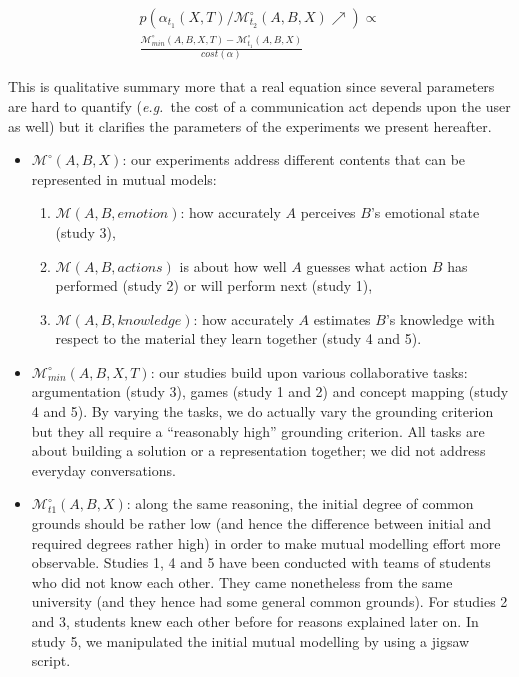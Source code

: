 \documentclass[natbib]{svjour3}
\newcommand{\eg}{{\textit{e.g.\ }}}
\newcommand{\model}[3]{{$\mathcal{M}(#1, #2, #3)$}}
\newcommand{\Model}[3]{{$\mathcal{M}^{\circ}(#1, #2, #3)$}}
\begin{document}
\begin{multline} \label{eq:probrepair}
    p(\alpha_{t_1}(X,T) / \mathcal{M}^{\circ}_{t_2}(A,B,X) \nearrow) \propto \\
    \frac{\mathcal{M}^{\circ}_{min}(A,B,X,T) - \mathcal{M}^{\circ}_{t_1}(A,B,X)}{cost (\alpha)}
\end{multline}

This is qualitative summary more that a real equation since several parameters
are hard to quantify (\eg the cost of a communication act depends upon the user
as well) but it clarifies the parameters of the experiments we present hereafter.

\begin{itemize}
    \item \Model{A}{B}{X}: our experiments address different contents that can be
        represented in mutual models:

    \begin{enumerate}
        \item \model{A}{B}{emotion}: how accurately $A$ perceives $B$'s emotional state
            (study 3),

        \item \model{A}{B}{actions} is about how well $A$ guesses what action $B$ has
            performed (study 2) or will perform next (study 1),

        \item \model{A}{B}{knowledge}: how accurately $A$ estimates $B$'s knowledge
            with respect to the material they learn together (study 4 and 5).

    \end{enumerate}



    \item $\mathcal{M}^{\circ}_{min}(A,B,X,T)$: our studies build upon various
        collaborative tasks: argumentation (study 3), games (study 1 and 2) and
        concept mapping (study 4 and 5). By varying the tasks, we do actually
        vary the grounding criterion but they all require a ``reasonably high''
        grounding criterion.  All tasks are about building a solution or a
        representation together; we did not address everyday conversations. 

    \item $\mathcal{M}^{\circ}_{t1}(A,B,X)$: along the same reasoning, the initial degree
        of common grounds should be rather low (and hence the difference between
        initial and required degrees rather high) in order to make mutual
        modelling effort more observable. Studies 1, 4 and 5 have been conducted
        with teams of students who did not know each other. They came
        nonetheless from the same university (and they hence had some general common
        grounds).  For studies 2 and 3, students knew each other before for
        reasons explained later on. In study 5, we manipulated the initial mutual modelling by
        using a {\sc jigsaw} script.


\end{itemize}
\end{document}
